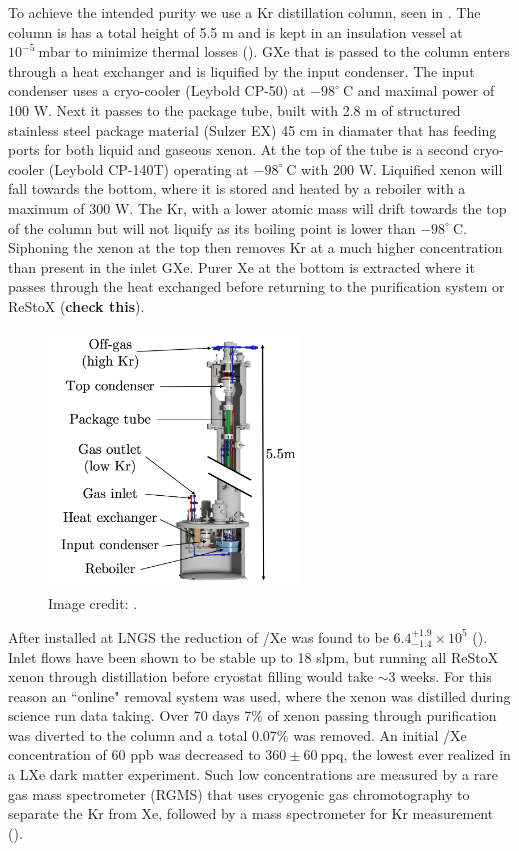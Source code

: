 To achieve the intended purity we use a Kr distillation column, seen in .  The column is has a total
height of 5.5 m and is kept in an insulation vessel at $10^{-5}\ \mathrm{mbar}$ to minimize thermal losses ().  GXe
that is passed to the column enters through a heat exchanger and is
liquified by the input condenser.  The input condenser uses a cryo-cooler (Leybold CP-50) at $-98^{\circ}\ \mathrm{C}$ and maximal power
of 100 W.  Next it passes to the package tube, built with 2.8 m of structured stainless steel package material (Sulzer EX) 45 cm in
diamater that has feeding ports for both liquid and gaseous xenon.  At the top of the tube is a second cryo-cooler (Leybold CP-140T)
operating at $-98^{\circ}\ \mathrm{C}$ with 200 W.  Liquified xenon will fall towards the bottom, where it is stored and heated by a
reboiler with a maximum of 300 W.  The Kr, with a lower atomic mass will drift towards the top of the column but will not liquify as its
boiling point is lower than $-98^{\circ}\ \mathrm{C}$.  Siphoning the xenon at the top then removes Kr at a much higher concentration than
present in the inlet GXe.  Purer Xe at the bottom is extracted where it passes through the heat exchanged before returning to the
purification system or ReStoX (\textbf{check this}).

\begin{figure}
\centering
\includegraphics[width=0.6\textwidth]{KrColumn}
\caption{Image credit: .}
\label{fig:xeno1t_kr_dist_column}
\end{figure}

After installed at LNGS the reduction of /Xe was found to be $6.4_{-1.4}^{+1.9} \times 10^{5}$
().  Inlet flows have been shown to be stable up to 18 slpm, but running all ReStoX xenon through distillation before
cryostat filling would take ${\sim}3$ weeks.  For this reason an ``online" removal system was used, where the xenon was distilled during
science run data taking.  Over 70 days 7\% of xenon passing through purification was diverted to the column and a total 0.07\% was
removed.  An initial /Xe concentration of 60 ppb was decreased to $360 \pm 60\ \mathrm{ppq}$, the lowest ever realized in a
LXe dark matter experiment.  Such low concentrations are measured by a rare gas mass spectrometer (RGMS) that uses cryogenic gas
chromotography to separate the Kr from Xe, followed by a mass spectrometer for Kr measurement ().

